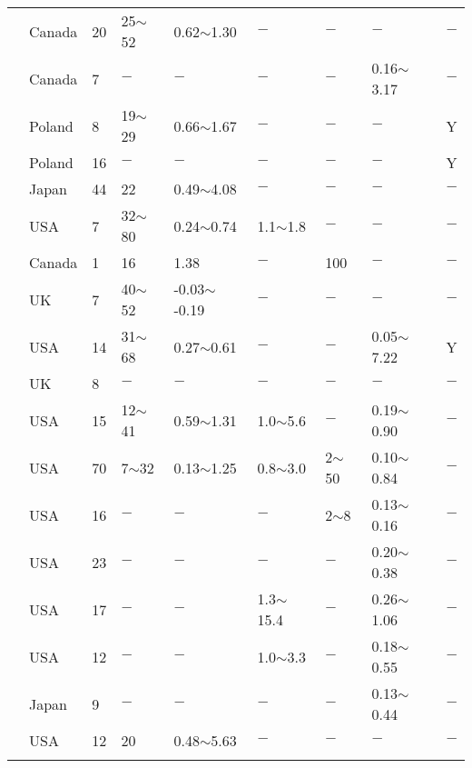 {\begin{longtable}{lllllllll}
    \citet{Tavenas1978283} & Canada & 20    & 25$\sim$52 & 0.62$\sim$1.30 & $-$     & $-$     & $-$     & $-$ \\
    \citet{Tavenas1977319} & Canada & 7     & $-$     & $-$     & $-$     & $-$     & 0.16$\sim$3.17 & $-$ \\
    \citet{Tschuschke2005121} & Poland & 8     & 19$\sim$29 & 0.66$\sim$1.67 & $-$     & $-$     & $-$     & Y \\
    \citet{Tschuschke20103} & Poland & 16    & $-$     & $-$     & $-$     & $-$     & $-$     & Y \\
    \citet{Tsuchida1999543} & Japan & 44    & 22    & 0.49$\sim$4.08 & $-$     & $-$     & $-$     & $-$ \\
    \citet{Tumay198572} & USA   & 7     & 32$\sim$80 & 0.24$\sim$0.74 & 1.1$\sim$1.8 & $-$     & $-$     & $-$ \\
    \citet{Vaid197935} & Canada & 1     & 16    & 1.38  & $-$     & 100   & $-$     & $-$ \\
    \citet{Ward195933} & UK    & 7     & 40$\sim$52 & -0.03$\sim$-0.19 & $-$     & $-$     & $-$     & $-$ \\
    \citet{Wei20102} & USA   & 14    & 31$\sim$68 & 0.27$\sim$0.61 & $-$     & $-$     & 0.05$\sim$7.22 & Y \\
    \citet{Windle197737} & UK    & 8     & $-$     & $-$     & $-$     & $-$     & $-$     & $-$ \\
    \citet{Wroth19851} & USA   & 15    & 12$\sim$41 & 0.59$\sim$1.31 & 1.0$\sim$5.6 & $-$     & 0.19$\sim$0.90 & $-$ \\
    \citet{Wu19581} & USA   & 70    & 7$\sim$32  & 0.13$\sim$1.25 & 0.8$\sim$3.0 & 2$\sim$50  & 0.10$\sim$0.84 & $-$ \\
    \citet{Wu19621} & USA   & 16    & $-$     & $-$     & $-$     & 2$\sim$8   & 0.13$\sim$0.16 & $-$ \\
    \citet{Wu1963145} & USA   & 23    & $-$     & $-$     & $-$     & $-$     & 0.20$\sim$0.38 & $-$ \\
    \citet{Wu1975913} & USA   & 17    & $-$     & $-$     & 1.3$\sim$15.4 & $-$     & 0.26$\sim$1.06 & $-$ \\
    \citet{Wu1978889} & USA   & 12    & $-$     & $-$     & 1.0$\sim$3.3 & $-$     & 0.18$\sim$0.55 & $-$ \\
    \citet{YASUHARA198277} & Japan & 9     & $-$     & $-$     & $-$     & $-$     & 0.13$\sim$0.44 & $-$ \\
    \citet{Zreik1995472} & USA   & 12    & 20    & 0.48$\sim$5.63 & $-$     & $-$     & $-$     & $-$ \\
    \label{table:7}%
\end{longtable}}